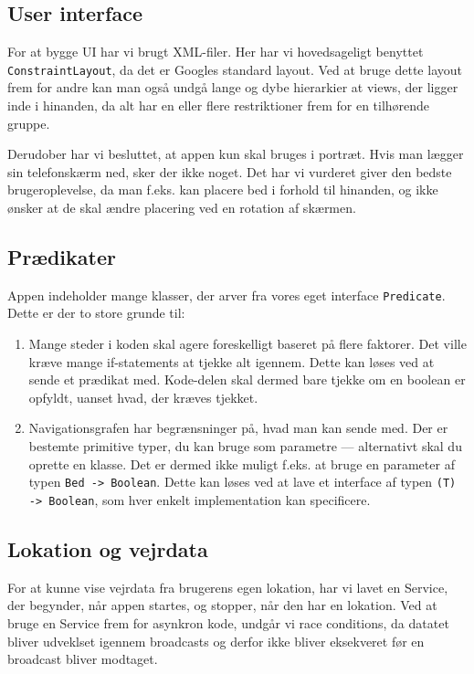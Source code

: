 \subsection{User interface}
For at bygge UI har vi brugt XML-filer. Her har vi hovedsageligt benyttet \texttt{ConstraintLayout}, da det er Googles standard layout. Ved at bruge dette layout frem for andre kan man også undgå lange og dybe hierarkier at views, der ligger inde i hinanden, da alt har en eller flere restriktioner frem for en tilhørende gruppe.

Derudober har vi besluttet, at appen kun skal bruges i portræt. Hvis man lægger sin telefonskærm ned, sker der ikke noget. Det har vi vurderet giver den bedste brugeroplevelse, da man f.eks. kan placere bed i forhold til hinanden, og ikke ønsker at de skal ændre placering ved en rotation af skærmen. 

\subsection{Prædikater}
Appen indeholder mange klasser, der arver fra vores eget interface \texttt{Predicate}. Dette er der to store grunde til:

\begin{enumerate}
    \item Mange steder i koden skal agere foreskelligt baseret på flere faktorer. Det ville kræve mange if-statements at tjekke alt igennem. Dette kan løses ved at sende et prædikat med. Kode-delen skal dermed bare tjekke om en boolean er opfyldt, uanset hvad, der kræves tjekket.
    \item Navigationsgrafen har begrænsninger på, hvad man kan sende med. Der er bestemte primitive typer, du kan bruge som parametre --- alternativt skal du oprette en klasse. Det er dermed ikke muligt f.eks. at bruge en parameter af typen \texttt{Bed -> Boolean}. Dette kan løses ved at lave et interface af typen \texttt{(T) -> Boolean}, som hver enkelt implementation kan specificere.
    
\end{enumerate}

\subsection{Lokation og vejrdata}
For at kunne vise vejrdata fra brugerens egen lokation, har vi lavet en Service, der begynder, når appen startes, og stopper, når den har en lokation. Ved at bruge en Service frem for asynkron kode, undgår vi race conditions, da datatet bliver udveklset igennem broadcasts og derfor ikke bliver eksekveret før en broadcast bliver modtaget.

